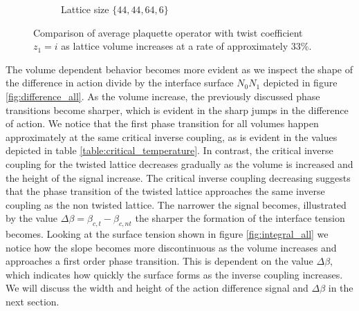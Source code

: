 \documentclass[english,twoside,openright]{UH_TCM_MSc}
\begin{document}
\begin{figure}[!htb]
\begin{subfigure}[t]{0.5\textwidth}
        \caption{Lattice size $\{44,44,64,6\}$}
    \end{subfigure}
    \caption{Comparison of average plaquette operator with twist coefficient $z_1=i$ as lattice volume increases at a rate of approximately $33$\%.} 
    \label{fig:action_volume}
\end{figure}

The volume dependent behavior becomes more evident as we inspect the shape of the difference in action divide by the interface surface $N_0N_1$ depicted in figure \ref{fig:difference_all}. As the volume increase, the previously discussed phase transitions become sharper, which is evident in the sharp jumps in the difference of action. We notice that the first phase transition for all volumes happen approximately at the same critical inverse coupling, as is evident in the values depicted in table \ref{table:critical_temperature}. In contrast, the critical inverse coupling for the twisted lattice decreases gradually as the volume is increased and the height of the signal increase. The critical inverse coupling decreasing suggests that the phase transition of the twisted lattice approaches the same inverse coupling as the non twisted lattice. The narrower the signal becomes, illustrated by the value $\Delta \beta = \beta_{c,t} - \beta_{c,nt}$ the sharper the formation of the interface tension becomes. Looking at the surface tension shown in figure \ref{fig:integral_all} we notice how the slope becomes more discontinuous as the volume increases and approaches a first order phase transition. This is dependent on the value $\Delta \beta$, which indicates how quickly the surface forms as the inverse coupling increases. We will discuss the width and height of the action difference signal and $\Delta \beta$ in the next section.
\end{document}
